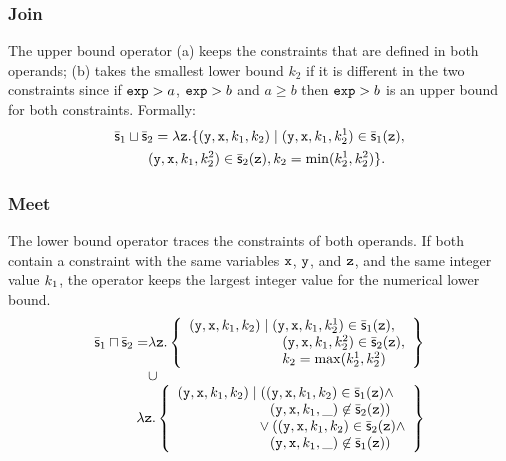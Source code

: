 \documentclass[10pt]{sigplanconf}
\begin{document}
\subsubsection*{Join}
The upper bound operator (a) keeps the constraints that are defined in both  operands; (b)  takes the smallest lower bound $k_2$ if it is different in the two constraints since if $\mathtt{exp} > a$,  $\mathtt{exp} > b $ and $a \geq b$  then $\mathtt{exp} > b$ is an upper bound for both constraints.
Formally:
\begin{multline*}
\bar{\mathsf{s}}_1 \sqcup  \bar{\mathsf{s}}_2  =  \lambda \mathtt{z}. \{ (\mathtt{y},\mathtt{x},k_1,k_2) \mid  (\mathtt{y},\mathtt{x},k_1,k^1_2) \in \bar{\mathsf{s}}_1(\mathtt{z}), \\
\quad (\mathtt{y},\mathtt{x},k_1,k^2_2) \in \bar{\mathsf{s}}_2(\mathtt{z}), k_2 =\min(k^1_2, k^2_2) \}.
\end{multline*}


\subsubsection*{Meet}
The lower bound operator traces the constraints of both operands. 
If both contain a constraint with the same variables $\mathtt{x}$, $\mathtt{y}$, and $\mathtt{z}$, and the same integer value $k_1$, the operator keeps the largest integer value for the numerical lower bound.
\[
\begin{array}{l@{}l}
\abstrs{s}_1 \sqcap \abstrs{s}_2 = & \lambda \var{z}.
\left\{
\begin{array}{l}
(\var{y},\var{x},\const{k}_1,\const{k}_2) \mid (\var{y},\var{x},\const{k}_1,\const{k^1_2}) \in \abstrs{s}_1(\var{z}),\\  
\phantom{(\var{y},\var{x},\const{k}_1,\const{k}_2) \mid \quad} (\var{y},\var{x},\const{k}_1,\const{k^2_2}) \in \abstrs{s}_2(\var{z}),\\
\phantom{(\var{y},\var{x},\const{k}_1,\const{k}_2) \mid \quad} \const{k}_2 = \max(\const{k^1_2}, \const{k^2_2})\\
\end{array}
\right\}
 \\
& \cup\\
\multicolumn{2}{@{\hspace*{35pt}}c}{
\lambda \var{z}. \left \{
\begin{array}{l}
   (\var{y},\var{x},\const{k}_1, \const{k}_2) \mid ((\var{y},\var{x},\const{k}_1, \const{k}_2) \in \abstrs{s}_1(\var{z}) \wedge\\
  \phantom{(\var{y},\var{x},\const{k}_1, \const{k}_2) \mid \vee}    (\var{y},\var{x},\const{k}_1, \_) \not\in \abstrs{s}_2(\var{z}))\\
  \phantom{(\var{y},\var{x},\const{k}_1, \const{k}_2) \mid}\vee ((\var{y},\var{x},\const{k}_1, \const{k}_2) \in \abstrs{s}_2(\var{z}) \wedge\\
  \phantom{(\var{y},\var{x},\const{k}_1, \const{k}_2) \mid \vee}    (\var{y},\var{x},\const{k}_1, \_) \not\in \abstrs{s}_1(\var{z}))
\end{array}
\right \}}
\end{array}
\]
\end{document}
